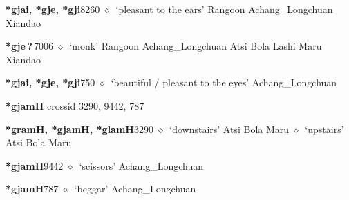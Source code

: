   \begin{list}{}{\leftmargin=1.5em \itemindent=-1.5em}
  \item {\footnotesize \textbf{*gjai, *gje, *gji}}{\tiny 8260}
         $\diamond$~`pleasant to the ears'
         Rangoon 
\hspace{1ex}
         Achang\_Longchuan 
\hspace{1ex}
         Xiandao 
  \item {\footnotesize \textbf{*gje\,?\,}}{\tiny 7006}
\hspace{1ex}
         $\diamond$~`monk'
         Rangoon 
\hspace{1ex}
         Achang\_Longchuan 
\hspace{1ex}
         Atsi 
\hspace{1ex}
         Bola 
\hspace{1ex}
         Lashi 
\hspace{1ex}
         Maru 
\hspace{1ex}
         Xiandao 
  \item {\footnotesize \textbf{*gjai, *gje, *gji}}{\tiny 750}
\hspace{1ex}
         $\diamond$~`beautiful / pleasant to the eyes'
         Achang\_Longchuan 
  \end{list}
\item
\textbf{*gjamH}
  {\tiny crossid 3290, 9442, 787}
  \begin{list}{}{\leftmargin=1.5em \itemindent=-1.5em}
  \item {\footnotesize \textbf{*gramH, *gjamH, *glamH}}{\tiny 3290}
         $\diamond$~`downstairs'
         Atsi 
\hspace{1ex}
         Bola 
\hspace{1ex}
         Maru 
\hspace{1ex}
         $\diamond$~`upstairs'
         Atsi 
\hspace{1ex}
         Bola 
\hspace{1ex}
         Maru 
  \item {\footnotesize \textbf{*gjamH}}{\tiny 9442}
\hspace{1ex}
         $\diamond$~`scissors'
         Achang\_Longchuan 
  \item {\footnotesize \textbf{*gjamH}}{\tiny 787}
\hspace{1ex}
         $\diamond$~`beggar'
         Achang\_Longchuan 
  \end{list}

